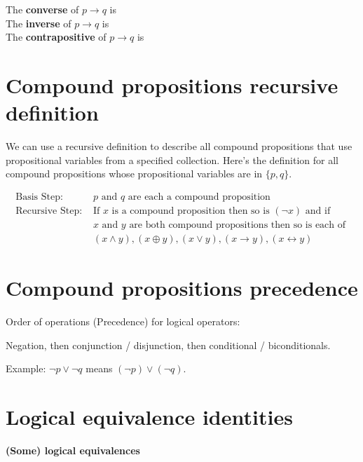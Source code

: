 \documentclass[12pt, oneside]{article}
\begin{document}
The {\bf converse}  of $p \to q$ is \underline{}\\

The {\bf inverse}  of $p \to q$ is \underline{}\\

The {\bf contrapositive}  of $p \to q$ is \underline{} \\
 \vfill
\section*{Compound propositions recursive definition}


We can use a recursive definition to describe all 
compound propositions that use propositional variables 
from a specified collection.  Here's the definition
for all compound propositions whose propositional variables 
are in $\{p, q\}$.

\[
\begin{array}{ll}
\textrm{Basis Step: } & p \textrm{ and } q \textrm{ are each a compound proposition} \\
\textrm{Recursive Step: } & \textrm{If } x \textrm{ is a compound proposition then so is } (\lnot x) 
\textrm{ and if } \\
& x \textrm{ and } y \textrm{ are both compound propositions then so is each of }\\
&(x \land y), (x \oplus y), (x \lor y), (x \to y), (x \leftrightarrow y)
\end{array}
\] \vfill
\section*{Compound propositions precedence}


Order of operations (Precedence) for logical operators: 

Negation, then conjunction / disjunction, then conditional / biconditionals.

Example: $\lnot p \lor \lnot q$ means $(\lnot p) \lor (\lnot q)$.
 \vfill
\section*{Logical equivalence identities}


{\bf (Some) logical equivalences}
\end{document}
